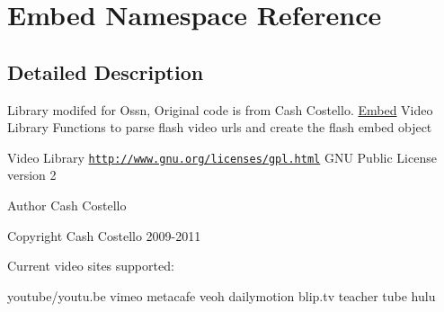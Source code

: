 \hypertarget{namespace_embed}{}\section{Embed Namespace Reference}
\label{namespace_embed}


\subsection{Detailed Description}
Library modifed for Ossn, Original code is from Cash Costello. \hyperlink{namespace_embed}{Embed} Video Library Functions to parse flash video urls and create the flash embed object

Video Library  \href{http://www.gnu.org/licenses/gpl.html}{\tt http\+://www.\+gnu.\+org/licenses/gpl.\+html} G\+NU Public License version 2 \begin{DoxyAuthor}{Author}
Cash Costello 
\end{DoxyAuthor}
\begin{DoxyCopyright}{Copyright}
Cash Costello 2009-\/2011
\end{DoxyCopyright}
Current video sites supported\+:

youtube/youtu.\+be vimeo metacafe veoh dailymotion blip.\+tv teacher tube hulu 